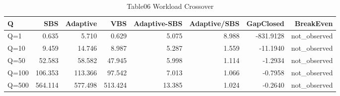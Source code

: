 \begin{table}[htbp]
\centering
\caption{Table06 Workload Crossover}
\begin{tabular}{lrrrrrrr}
\hline
Q & SBS & Adaptive & VBS & Adaptive-SBS & Adaptive/SBS & GapClosed & BreakEven \\
\hline
Q=1 & 0.635 & 5.710 & 0.629 & 5.075 & 8.988 & -831.9128 & not\_observed \\
Q=10 & 9.459 & 14.746 & 8.987 & 5.287 & 1.559 & -11.1940 & not\_observed \\
Q=50 & 52.583 & 58.582 & 47.945 & 5.998 & 1.114 & -1.2934 & not\_observed \\
Q=100 & 106.353 & 113.366 & 97.542 & 7.013 & 1.066 & -0.7958 & not\_observed \\
Q=500 & 564.114 & 577.498 & 513.424 & 13.385 & 1.024 & -0.2640 & not\_observed \\
\hline
\end{tabular}
\end{table}
